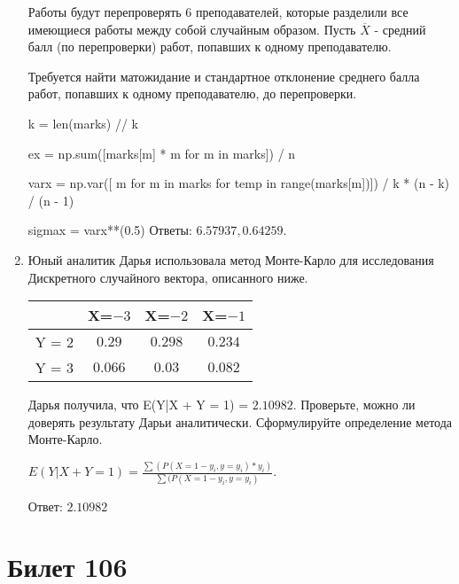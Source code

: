 \documentclass[a4paper,12pt]{article}
\begin{document}
\begin{enumerate}
	Работы будут перепроверять $6$ преподавателей, которые разделили все имеющиеся работы между собой случайным образом. Пусть $\overline{X}$ - средний балл (по перепроверки) работ, попавших к одному преподавателю.

	Требуется найти матожидание и стандартное отклонение среднего балла работ, попавших к одному преподавателю, до перепроверки.
    


    


    k = len(marks) // k

    ex = np.sum([marks[m] * m for m in marks]) / n

    varx = np.var([ m for m in marks for temp in range(marks[m])]) / k * (n - k) / (n - 1)

    sigmax = varx**(0.5)
    Ответы: $6.57937, 0.64259$.

    

\item

    
    	Юный аналитик Дарья использовала метод Монте-Карло для исследования Дискретного случайного вектора, описанного ниже.

        \begin{tabular}{|c|c|c|c|}
	\hline
	& X=$-3$ & X=$-2$ & X=$-1$ \\
	\hline
	Y = $2$ & $0.29$ & $0.298$  &  $0.234$ \\
	\hline
	Y = $3$ & $0.066$ & $0.03$ & $0.082$  \\
	\hline
\end{tabular}

    	Дарья получила, что E(Y|X + Y = 1) = $2.10982$.
    	Проверьте, можно ли доверять результату Дарьи аналитически. Сформулируйте определение метода Монте-Карло.
    


    
        $E(Y|X+Y=1) = \frac{\sum(P(X=1 - y_i, y=y_i) * y_i)}{\sum(P(X=1 - y_i, y=y_i)}$.

        Ответ: $2.10982$
    


\end{enumerate}

\section{Билет 106}
\end{document}
